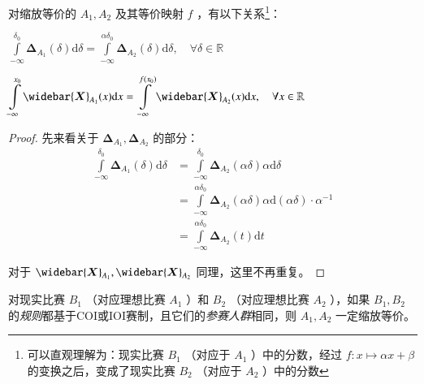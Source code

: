         \begin{proposition}[缩放等价的实际含义]
            对缩放等价的 $A_1,A_2$ 及其等价映射 $f$ ，有以下关系\footnote{可以直观理解为：现实比赛 $B_1$ （对应于 $A_1$ ）中的分数，经过 $f:x\mapsto\alpha x+\beta$ 的变换之后，变成了现实比赛 $B_2$ （对应于 $A_2$ ）中的分数}：
            \begin{asparaenum}
                \item $\displaystyle\int\limits_{-\infty}^{\delta_0} \bm{\Delta}_{A_1}(\delta)\mathrm{d}\delta=\displaystyle\int\limits_{-\infty}^{\alpha\delta_0} \bm{\Delta}_{A_2}(\delta)\mathrm{d}\delta,\quad\forall\delta\in\mathbb{R}$
                \item $\displaystyle\int\limits_{-\infty}^{x_0} \widebar{\bm{X}}_{A_1}(x)\mathrm{d}x=\displaystyle\int\limits_{-\infty}^{f(x_0)} \widebar{\bm{X}}_{A_2}(x)\mathrm{d}x,\quad\forall x\in\mathbb{R}$
            \end{asparaenum}

            \label{prop:equivalenceAfterScalingMeaning}
        \end{proposition}

        \begin{proof}
            先来看关于 $\bm{\Delta}_{A_1},\bm{\Delta}_{A_2}$ 的部分：
            \begin{align*}
                \int\limits_{-\infty}^{\delta_0} \bm{\Delta}_{A_1}(\delta)\mathrm{d}\delta 
                &=\int\limits_{-\infty}^{\delta_0} \bm{\Delta}_{A_2}(\alpha\delta)\alpha\mathrm{d}\delta \\
                &=\int\limits_{-\infty}^{\alpha\delta_0} \bm{\Delta}_{A_2}(\alpha\delta)\alpha \mathrm{d}(\alpha\delta)\cdot\alpha^{-1} \\
                &=\int\limits_{-\infty}^{\alpha\delta_0}\bm{\Delta}_{A_2}(t)\mathrm{d}t
            \end{align*}

            对于 $\widebar{\bm{X}}_{A_1},\widebar{\bm{X}}_{A_2}$ 同理，这里不再重复。
        \end{proof}

        \begin{assumption}
            对现实比赛 $B_1$ （对应理想比赛 $A_1$ ）和 $B_2$ （对应理想比赛 $A_2$ ），如果 $B_1,B_2$ 的\emph{规则}都基于COI或IOI赛制，且它们的\emph{参赛人群}相同，则 $A_1,A_2$ 一定缩放等价。
            \label{ass:equivalenceBetweenCodingContests}
        \end{assumption}

